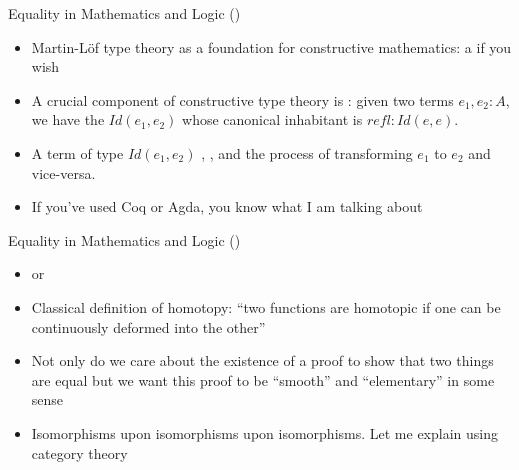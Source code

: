 \documentclass[11pt]{beamer}
\newcommand{\red}[1]{{\color{red}{#1}}}
\newcommand{\blue}[1]{{\color{blue}{#1}}}
\begin{document}
\begin{frame}{Equality in Mathematics and Logic (\blue{History})}

\begin{itemize}

\vfill\item Martin-L\"of type theory as a foundation for
  constructive mathematics: a \red{computable set theory} if you wish

\vfill\item A crucial component of constructive type theory is \red{equality
  types}: given two terms $e_1, e_2 : A$, we have the \red{type}
$\textit{Id}(e_1,e_2)$ whose canonical inhabitant is $\mathit{refl} :
\textit{Id}(e,e)$.

\vfill\item A term of type $\textit{Id}(e_1,e_2)$ \red{witnesses},
\red{explains}, and \red{models} the process of transforming $e_1$ to $e_2$
and vice-versa.

\vfill\item If you've used Coq or Agda, you know what I am talking about

\end{itemize}

\vfill

\end{frame}

\begin{frame}{Equality in Mathematics and Logic (\blue{New Program})}

\begin{itemize}

  \vfill\item \red{Homotopy version of Martin-L\"of Type Theory} or
  \red{Groupoid Interpretation of Martin-L\"of Type Theory}

\vfill\item Classical definition of homotopy: ``two functions are homotopic
if one can be continuously deformed into the other''

\vfill\item Not only do we care about the existence of a proof to show that
two things are equal but we want this proof to be ``smooth'' and
``elementary'' in some sense

\vfill\item Isomorphisms upon isomorphisms upon isomorphisms. Let me explain
using \pause category theory

\end{itemize}

\vfill

\end{frame}
\end{document}

